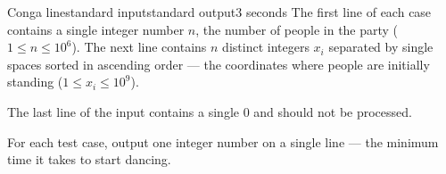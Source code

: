 \begin{problem}{Conga line}{standard input}{standard output}{3 seconds}
The first line of each case contains a single integer number $n$, the number of people in the party ($1 \le n \le 10^6 $).
The next line contains $n$ distinct integers $x_i$ separated by single spaces sorted in ascending order --- the coordinates where people are initially standing 
($1 \le x_i \le 10^9$).

The last line of the input contains a single $0$ and should not be processed.

\OutputFile

For each test case, output one integer number on a single line --- the minimum time it takes to start dancing.

\Example

\begin{example}
%
\end{example}

\end{problem}
